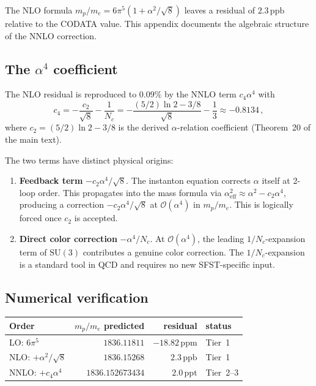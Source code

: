 \documentclass[11pt,a4paper]{article}
\begin{document}
The NLO formula $m_p/m_e = 6\pi^5(1+\alpha^2/\sqrt{8})$ leaves a
residual of $2.3\,\mathrm{ppb}$ relative to the CODATA value.  This
appendix documents the algebraic structure of the NNLO correction.

\subsection{The $\alpha^4$ coefficient}

The NLO residual is reproduced to $0.09\%$ by the NNLO term
$c_4\alpha^4$ with
\begin{equation}\label{eq:c4}
  c_4 = -\frac{c_2}{\sqrt{8}} - \frac{1}{N_c}
      = -\frac{(5/2)\ln 2 - 3/8}{\sqrt{8}} - \frac{1}{3}
      \approx -0.8134\,,
\end{equation}
where $c_2=(5/2)\ln 2 - 3/8$ is the derived $\alpha$-relation
coefficient (Theorem~20 of the main text).

The two terms have distinct physical origins:

\begin{enumerate}[leftmargin=1.5em]
\item \textbf{Feedback term} $-c_2\alpha^4/\sqrt{8}$.
  The instanton equation corrects $\alpha$ itself at 2-loop order.
  This propagates into the mass formula via $\alpha_{\mathrm{eff}}^2
  \approx\alpha^2-c_2\alpha^4$, producing a correction
  $-c_2\alpha^4/\sqrt{8}$ at $\mathcal{O}(\alpha^4)$ in $m_p/m_e$.
  This is logically forced once $c_2$ is accepted.

\item \textbf{Direct color correction} $-\alpha^4/N_c$.
  At $\mathcal{O}(\alpha^4)$, the leading $1/N_c$-expansion term of
  $\mathrm{SU}(3)$ contributes a genuine color correction.  The
  $1/N_c$-expansion is a standard tool in QCD and requires no new
  SFST-specific input.
\end{enumerate}

\subsection{Numerical verification}

\begin{center}
\renewcommand{\arraystretch}{1.2}
\begin{tabular}{lrrl}
\toprule
Order & $m_p/m_e$ predicted & residual & status\\
\midrule
LO: $6\pi^5$ & $1836.11811$ & $-18.82\,\mathrm{ppm}$ & Tier~1\\
NLO: $+\alpha^2/\sqrt{8}$ & $1836.15268$ & $2.3\,\mathrm{ppb}$ & Tier~1\\
NNLO: $+c_4\alpha^4$ & $1836.152673434$ & $2.0\,\mathrm{ppt}$ & Tier~2--3\\
\bottomrule
\end{tabular}
\end{center}
\end{document}
